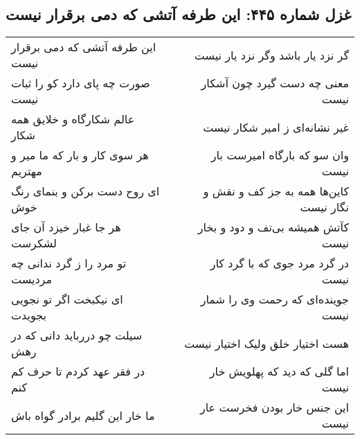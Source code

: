 \begin{center}
\section*{غزل شماره ۴۴۵: این طرفه آتشی که دمی برقرار نیست}
\label{sec:0445}
\begin{longtable}{l p{0.5cm} r}
این طرفه آتشی که دمی برقرار نیست
&&
گر نزد یار باشد وگر نزد یار نیست
\\
صورت چه پای دارد کو را ثبات نیست
&&
معنی چه دست گیرد چون آشکار نیست
\\
عالم شکارگاه و خلایق همه شکار
&&
غیر نشانه‌ای ز امیر شکار نیست
\\
هر سوی کار و بار که ما میر و مهتریم
&&
وان سو که بارگاه امیرست بار نیست
\\
ای روح دست برکن و بنمای رنگ خوش
&&
کاین‌ها همه به جز کف و نقش و نگار نیست
\\
هر جا غبار خیزد آن جای لشکرست
&&
کآتش همیشه بی‌تف و دود و بخار نیست
\\
تو مرد را ز گرد ندانی چه مردیست
&&
در گرد مرد جوی که با گرد کار نیست
\\
ای نیکبخت اگر تو نجویی بجویدت
&&
جوینده‌ای که رحمت وی را شمار نیست
\\
سیلت چو دررباید دانی که در رهش
&&
هست اختیار خلق ولیک اختیار نیست
\\
در فقر عهد کردم تا حرف کم کنم
&&
اما گلی که دید که پهلویش خار نیست
\\
ما خار این گلیم برادر گواه باش
&&
این جنس خار بودن فخرست عار نیست
\\
\end{longtable}
\end{center}
